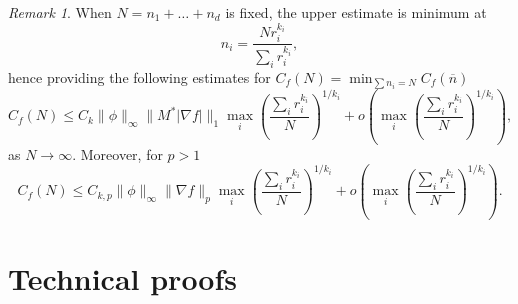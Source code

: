 \documentclass{amsart}
\theoremstyle{remark}
\newtheorem{remark}[theorem]{Remark}
\numberwithin{equation}{section}
\numberwithin{figure}{section}
\def\v{\overline}
\begin{document}
\begin{remark}
	When $N = n_1 + \ldots + n_d$ is fixed, the upper estimate is minimum at
	\[
	n_i = \frac{N r_i^{k_i}}{\sum_i r_i^{k_i}},
	\]
	hence providing the following estimates for $C_f(N) = \min_{\sum n_i = N} C_f(\v n)$
	\[
	C_f(N) \leq C_k\|\phi\|_{\infty} \|M^* |\nabla f| \|_1 \max_i \left(\frac{\sum_i r_i^{k_i}}{N}\right)^{1/k_i} + o\left( \max_i\left( \frac{\sum_i r_i^{k_i}}{N}\right)^{1/k_i}\right) ,
	\]
	as $N\to\infty$. Moreover, for $p>1$
	\[
	C_f(N) \leq C_{k, p}\|\phi\|_{\infty} \| \nabla f \|_p \max_i\left(\frac{\sum_i r_i^{k_i}}{N}\right)^{1/k_i} + o\left(\max_i \left( \frac{\sum_i r_i^{k_i}}{N}\right)^{1/k_i}\right) .
	\]
	
\end{remark}	



\section{Technical proofs}
	\label{section_tech_proofs}
\end{document}
